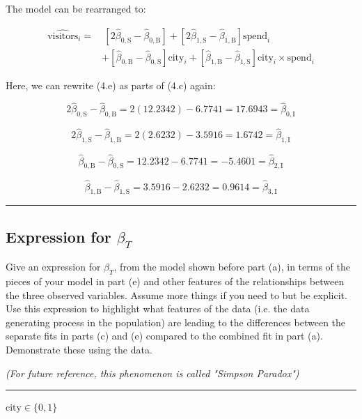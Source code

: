 \documentclass{article}
\newenvironment{colorparagraph}[1]{\par\color{#1}}{\par}
\begin{document}
The model can be rearranged to:

\begin{align*}
\hat{\text{visitors}}_i
=& \ \left[ 2 \hat{\beta}_{0, \text{S}} - \hat{\beta}_{0, \text{B}} \right] 
     + \left[ 2 \hat{\beta}_{1, \text{S}} - \hat{\beta}_{1, \text{B}} \right] \text{spend}_i \\
     &+ \left[ \hat{\beta}_{0, \text{B}} - \hat{\beta}_{0, \text{S}} \right] \text{city}_i
     + \left[ \hat{\beta}_{1, \text{B}} - \hat{\beta}_{1, \text{S}} \right] \text{city}_i \times \text{spend}_i
\end{align*}

Here, we can rewrite (4.e) as parts of (4.c) again:

$$
2 \hat{\beta}_{0, \text{S}} - \hat{\beta}_{0, \text{B}} = 2 (12.2342) - 6.7741 = 17.6943 = \hat{\beta}_{0, \text{I}}
$$

$$
2 \hat{\beta}_{1, \text{S}} - \hat{\beta}_{1, \text{B}} = 2 (2.6232) - 3.5916 = 1.6742 = \hat{\beta}_{1, \text{I}}
$$

$$
\hat{\beta}_{0, \text{B}} - \hat{\beta}_{0, \text{S}} = 12.2342 - 6.7741 = -5.4601 = \hat{\beta}_{2, \text{I}}
$$

$$
\hat{\beta}_{1, \text{B}} - \hat{\beta}_{1, \text{S}} = 3.5916 - 2.6232 = 0.9614 = \hat{\beta}_{3, \text{I}}
$$



\begin{colorparagraph}{questioncolor}
\rule{\textwidth}{0.5pt}

\label{q4f}\subsection{Expression for \(\beta_T\)}
Give an expression for \(\beta_T\), from the model shown before part (a), in terms of the pieces of your model in part (e) and other features of the relationships between the three observed variables. Assume more things if you need to but be explicit. Use this expression to highlight what features of the data (i.e. the data generating process in the population) are leading to the differences between the separate fits in parts (c) and (e) compared to the combined fit in part (a). Demonstrate these using the data.

\textit{(For future reference, this phenomenon is called "Simpson Paradox")}

\rule{\textwidth}{0.5pt}
\end{colorparagraph}

\textbf{$\text{city} \in \{0, 1\}$}
\end{document}
